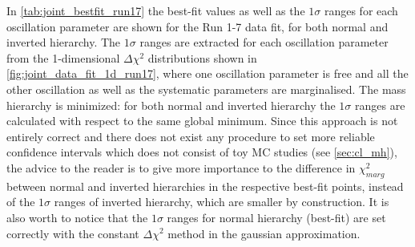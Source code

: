 %
%
%





In \cref{tab:joint_bestfit_run17} the best-fit values as well as the $1\sigma$ ranges for each 
oscillation parameter are shown for the Run 1-7 data fit, for both normal and inverted hierarchy.
The $1\sigma$ ranges are extracted for each oscillation parameter
from the 1-dimensional $\Delta \chi^2$ distributions shown in \cref{fig:joint_data_fit_1d_run17},
where one oscillation parameter is free and all the other oscillation as well as the systematic 
parameters are marginalised.
The mass hierarchy is minimized:
for both normal and inverted hierarchy the $1\sigma$ ranges are calculated with respect to the 
same global minimum.
Since this approach is not entirely correct and there does not exist any procedure 
to set more reliable confidence intervals which does not consist of toy MC studies (see \cref{sec:cl_mh}),
the advice to the reader is to give more importance to the difference in $\chi^2_{marg}$
between normal and inverted hierarchies in the respective best-fit points, 
instead of the $1\sigma$ ranges of inverted hierarchy, 
which are smaller by construction.
It is also worth to notice that the $1\sigma$ ranges for normal hierarchy (best-fit)
are set correctly with the constant $\Delta \chi^2$ method in the gaussian approximation.

